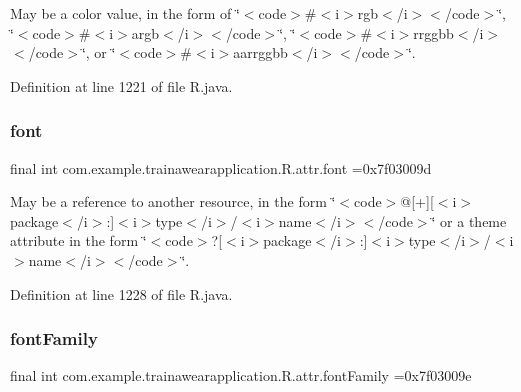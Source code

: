May be a color value, in the form of \char`\"{}$<$code$>$\#$<$i$>$rgb$<$/i$>$$<$/code$>$\char`\"{}, \char`\"{}$<$code$>$\#$<$i$>$argb$<$/i$>$$<$/code$>$\char`\"{}, \char`\"{}$<$code$>$\#$<$i$>$rrggbb$<$/i$>$$<$/code$>$\char`\"{}, or \char`\"{}$<$code$>$\#$<$i$>$aarrggbb$<$/i$>$$<$/code$>$\char`\"{}. 

Definition at line 1221 of file R.\+java.

\mbox{\label{classcom_1_1example_1_1trainawearapplication_1_1_r_1_1attr_a047dd58fee4de52a9ebea90832d88dfb}} 
\subsubsection{\texorpdfstring{font}{font}}
{\footnotesize\ttfamily final int com.\+example.\+trainawearapplication.\+R.\+attr.\+font =0x7f03009d\hspace{0.3cm}{\ttfamily [static]}}

May be a reference to another resource, in the form \char`\"{}$<$code$>$@\mbox{[}+\mbox{]}\mbox{[}$<$i$>$package$<$/i$>$\+:\mbox{]}$<$i$>$type$<$/i$>$/$<$i$>$name$<$/i$>$$<$/code$>$\char`\"{} or a theme attribute in the form \char`\"{}$<$code$>$?\mbox{[}$<$i$>$package$<$/i$>$\+:\mbox{]}$<$i$>$type$<$/i$>$/$<$i$>$name$<$/i$>$$<$/code$>$\char`\"{}. 

Definition at line 1228 of file R.\+java.

\mbox{\label{classcom_1_1example_1_1trainawearapplication_1_1_r_1_1attr_ab41cde48b260cd27c78c107eb7587a56}} 
\subsubsection{\texorpdfstring{fontFamily}{fontFamily}}
{\footnotesize\ttfamily final int com.\+example.\+trainawearapplication.\+R.\+attr.\+font\+Family =0x7f03009e\hspace{0.3cm}{\ttfamily [static]}}

